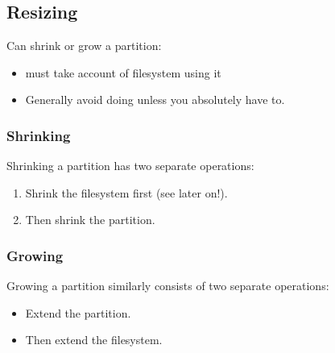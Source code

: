 \documentclass[slides]{pgnotes}
\begin{document}
\subsection{Resizing}

Can shrink or grow a partition:
\begin{itemize}
\item must take account of filesystem using it
\item Generally avoid doing unless you absolutely have to.
\end{itemize}

\newpage
\subsubsection{Shrinking}

Shrinking a partition has two separate operations:
\begin{enumerate}
\item Shrink the filesystem first (see later on!).
\item Then shrink the partition.
\end{enumerate}

\subsubsection{Growing}

Growing a partition similarly consists of two separate operations:
\begin{itemize}
\item Extend the partition.
\item Then extend the filesystem.
\end{itemize}
\end{document}

